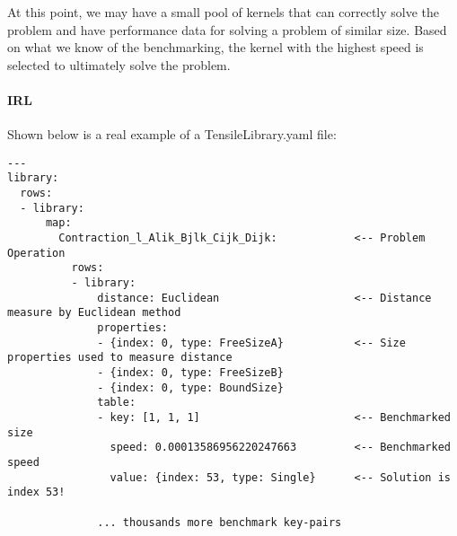 \documentclass[]{article}
\begin{document}
At this point, we may have a small pool of kernels that can correctly solve the problem and have performance data for solving a problem of similar size. Based on what we know of the benchmarking, the kernel with the highest speed is selected to ultimately solve the problem.

\paragraph{IRL}

Shown below is a real example of a TensileLibrary.yaml file:


\begin{verbatim}
---
library:
  rows:
  - library:
      map:
        Contraction_l_Alik_Bjlk_Cijk_Dijk:            <-- Problem Operation
          rows:
          - library:
              distance: Euclidean                     <-- Distance measure by Euclidean method
              properties:
              - {index: 0, type: FreeSizeA}           <-- Size properties used to measure distance
              - {index: 0, type: FreeSizeB}
              - {index: 0, type: BoundSize}
              table:
              - key: [1, 1, 1]                        <-- Benchmarked size
                speed: 0.00013586956220247663         <-- Benchmarked speed
                value: {index: 53, type: Single}      <-- Solution is index 53!

              ... thousands more benchmark key-pairs


\end{verbatim}
\end{document}
